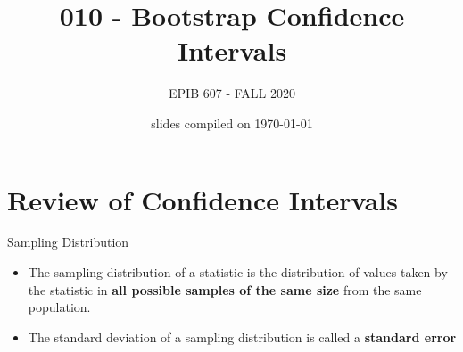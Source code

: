 \documentclass[10pt]{beamer}\usepackage[]{graphicx}\usepackage[]{color}
\begin{document}
	


	\title{010 - Bootstrap Confidence Intervals}
\author{EPIB 607 - FALL 2020}

\date{slides compiled on \today}

\maketitle


\section{Review of Confidence Intervals}

\begin{frame}{Sampling Distribution}
	
	\begin{defm}
		\begin{itemize}
			\item The sampling distribution of a statistic is the distribution of values taken by the statistic in \textbf{all possible samples of the same size} from the same population.
			\item The standard deviation of a sampling distribution is called a \textbf{standard error}
		\end{itemize} 
	\end{defm}
	
	
\end{frame}
\end{document}
